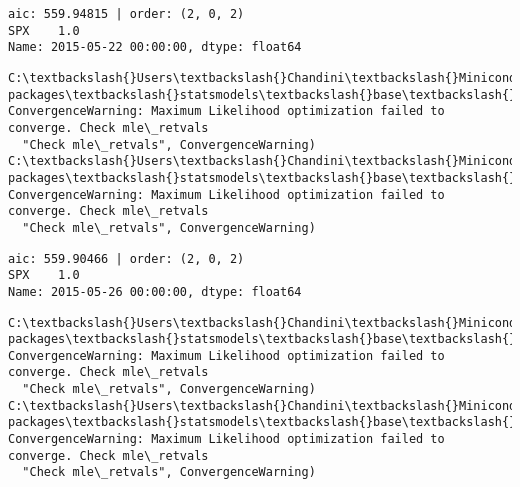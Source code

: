 \documentclass[11pt]{article}
\begin{document}
    \begin{Verbatim}[commandchars=\\\{\}]
aic: 559.94815 | order: (2, 0, 2)
SPX    1.0
Name: 2015-05-22 00:00:00, dtype: float64

    \end{Verbatim}

    \begin{Verbatim}[commandchars=\\\{\}]
C:\textbackslash{}Users\textbackslash{}Chandini\textbackslash{}Miniconda3\textbackslash{}envs\textbackslash{}auquan\textbackslash{}lib\textbackslash{}site-packages\textbackslash{}statsmodels\textbackslash{}base\textbackslash{}model.py:496: ConvergenceWarning: Maximum Likelihood optimization failed to converge. Check mle\_retvals
  "Check mle\_retvals", ConvergenceWarning)
C:\textbackslash{}Users\textbackslash{}Chandini\textbackslash{}Miniconda3\textbackslash{}envs\textbackslash{}auquan\textbackslash{}lib\textbackslash{}site-packages\textbackslash{}statsmodels\textbackslash{}base\textbackslash{}model.py:496: ConvergenceWarning: Maximum Likelihood optimization failed to converge. Check mle\_retvals
  "Check mle\_retvals", ConvergenceWarning)

    \end{Verbatim}

    \begin{Verbatim}[commandchars=\\\{\}]
aic: 559.90466 | order: (2, 0, 2)
SPX    1.0
Name: 2015-05-26 00:00:00, dtype: float64

    \end{Verbatim}

    \begin{Verbatim}[commandchars=\\\{\}]
C:\textbackslash{}Users\textbackslash{}Chandini\textbackslash{}Miniconda3\textbackslash{}envs\textbackslash{}auquan\textbackslash{}lib\textbackslash{}site-packages\textbackslash{}statsmodels\textbackslash{}base\textbackslash{}model.py:496: ConvergenceWarning: Maximum Likelihood optimization failed to converge. Check mle\_retvals
  "Check mle\_retvals", ConvergenceWarning)
C:\textbackslash{}Users\textbackslash{}Chandini\textbackslash{}Miniconda3\textbackslash{}envs\textbackslash{}auquan\textbackslash{}lib\textbackslash{}site-packages\textbackslash{}statsmodels\textbackslash{}base\textbackslash{}model.py:496: ConvergenceWarning: Maximum Likelihood optimization failed to converge. Check mle\_retvals
  "Check mle\_retvals", ConvergenceWarning)

    \end{Verbatim}
\end{document}
